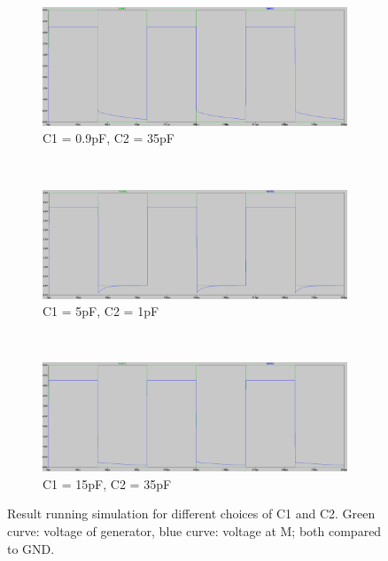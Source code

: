 \documentclass[journal]{IEEEtran}
\begin{document}
\begin{figure}
	\begin{subfigure}[b]{\columnwidth}
		\centering
		\includegraphics[width=\textwidth]{img/sim_1.png}
		\caption{C1 = 0.9pF, C2 = 35pF}
	\end{subfigure} \\
	\begin{subfigure}[b]{\columnwidth}
		\centering
		\includegraphics[width=\textwidth]{img/sim_2.png}
		\caption{C1 = 5pF, C2 = 1pF}
	\end{subfigure} \\
	\begin{subfigure}[b]{\columnwidth}
		\centering
		\includegraphics[width=\textwidth]{img/sim_3.png}
		\caption{C1 = 15pF, C2 = 35pF}
	\end{subfigure}
	\caption{Result running simulation for different choices of C1 and C2. Green
	curve:
	voltage of generator, blue curve: voltage at M; both compared to GND.}
	\label{fig:signal_model_result}
\end{figure}
\end{document}
